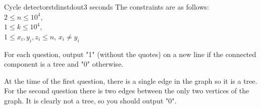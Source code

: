 \begin{problem}{Cycle detector}{stdin}{stdout}{3 seconds}
The constraints are as follows:\\
$2\le n \le 10^4$,\\ 
$1\le k \le 10^4$,\\ 
$1\le x_i,y_i,z_i \le n$, $x_i\not=y_i$ 

\OutputFile

For each question, output "1" (without the quotes) on a new line if the connected component is a tree and "0" otherwise.

\Example

\begin{examplewide}
%
\end{examplewide}

At the time of the first question, there is a single edge in the graph so it is a tree.\\
For the second question there is two edges between the only two vertices of the graph. It is clearly not a tree, so you should output "0".

\end{problem}
